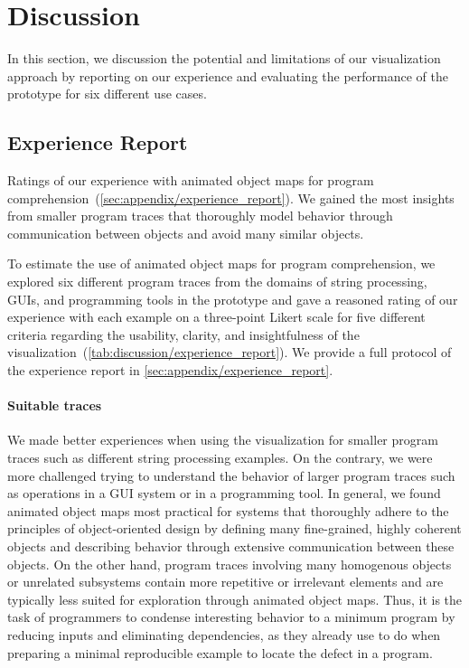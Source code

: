 \section{Discussion}
\label{sec:discussion}

In this section, we discussion the potential and limitations of our visualization approach by reporting on our experience and evaluating the performance of the \tfd{} prototype for six different use cases.

\subsection{Experience Report}

\begin{table}
	\centering
	\caption{
		Ratings of our experience with animated object maps for program comprehension~(\cref{sec:appendix/experience_report}).
		We gained the most insights from smaller program traces that thoroughly model behavior through communication between objects and avoid many similar objects.
	}
	\label{tab:discussion/experience_report}
	\begin{threeparttable}
		\centering
		{\footnotesize
		}
	\end{threeparttable}
\end{table}

To estimate the use of animated object maps for program comprehension, we explored six different program traces from the domains of string processing, GUIs, and programming tools in the \tfd{} prototype and gave a reasoned rating of our experience with each example on a three-point Likert scale for five different criteria regarding the usability, clarity, and insightfulness of the visualization~(\cref{tab:discussion/experience_report}).
We provide a full protocol of the experience report in \cref{sec:appendix/experience_report}.

\paragraph{Suitable traces}

We made better experiences when using the visualization for smaller program traces such as different string processing examples.
On the contrary, we were more challenged trying to understand the behavior of larger program traces such as operations in a GUI system or in a programming tool.
In general, we found animated object maps most practical for systems that thoroughly adhere to the principles of object-oriented design by defining many fine-grained, highly coherent objects and describing behavior through extensive communication between these objects.
On the other hand, program traces involving many homogenous objects or unrelated subsystems contain more repetitive or irrelevant elements and are typically less suited for exploration through animated object maps.
Thus, it is the task of programmers to condense interesting behavior to a minimum program by reducing inputs and eliminating dependencies, as they already use to do when preparing a minimal reproducible example to locate the defect in a program.

